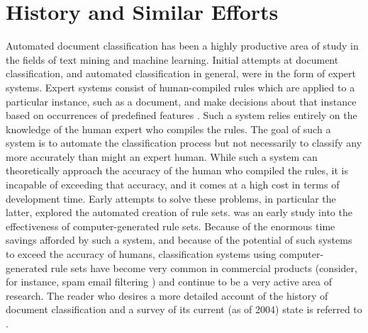 \documentclass[main.tex]{subfiles}
\begin{document}
\section{History and Similar Efforts}

Automated document classification has been a highly productive area of study in the fields of text mining and machine learning. Initial attempts at document classification, and automated classification in general, were in the form of expert systems. Expert systems consist of human-compiled rules which are applied to a particular instance, such as a document, and make decisions about that instance based on occurrences of predefined features \citep{clifford:1983}. Such a system relies entirely on the knowledge of the human expert who compiles the rules. The goal of such a system is to automate the classification process but not necessarily to classify any more accurately than might an expert human. While such a system can theoretically approach the accuracy of the human who compiled the rules, it is incapable of exceeding that accuracy, and it comes at a high cost in terms of development time. Early attempts to solve these problems, in particular the latter, explored the automated creation of rule sets. \citet{apte:1994} was an early study into the effectiveness of computer-generated rule sets. Because of the enormous time savings afforded by such a system, and because of the potential of such systems to exceed the accuracy of humans, classification systems using computer-generated rule sets have become very common in commercial products (consider, for instance, spam email filtering \citep{cormack:2008}) and continue to be a very active area of research. The reader who desires a more detailed account of the history of document classification and a survey of its current (as of 2004) state is referred to \citet{berry:2004}.
\end{document}
